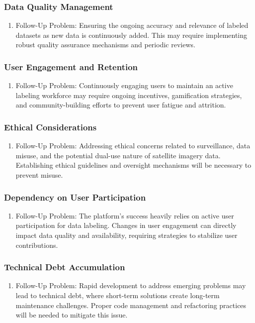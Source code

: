 \documentclass[12pt]{article}
\begin{document}
\subsubsection{Data Quality Management}
\begin{enumerate}
    \item Follow-Up Problem: Ensuring the ongoing accuracy and relevance of labeled datasets as new data is continuously added. This may require implementing robust quality assurance mechanisms and periodic reviews.
\end{enumerate}
\subsubsection{User Engagement and Retention}
\begin{enumerate}
    \item Follow-Up Problem: Continuously engaging users to maintain an active labeling workforce may require ongoing incentives, gamification strategies, and community-building efforts to prevent user fatigue and attrition.
\end{enumerate}
\subsubsection{Ethical Considerations}
\begin{enumerate}
    \item Follow-Up Problem: Addressing ethical concerns related to surveillance, data misuse, and the potential dual-use nature of satellite imagery data. Establishing ethical guidelines and oversight mechanisms will be necessary to prevent misuse.
\end{enumerate}
\subsubsection{Dependency on User Participation}
\begin{enumerate}
    \item Follow-Up Problem: The platform's success heavily relies on active user participation for data labeling. Changes in user engagement can directly impact data quality and availability, requiring strategies to stabilize user contributions.
\end{enumerate}
\subsubsection{Technical Debt Accumulation}
\begin{enumerate}
    \item Follow-Up Problem: Rapid development to address emerging problems may lead to technical debt, where short-term solutions create long-term maintenance challenges. Proper code management and refactoring practices will be needed to mitigate this issue.
\end{enumerate}
\end{document}
